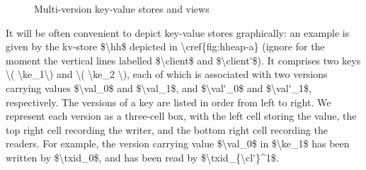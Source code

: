 \begin{figure}[t]
\begin{center}
\begin{onethirdsubfig}
\caption{A view for client \( \cl' \)}
\label{fig:view-of-cl-prime}
\end{onethirdsubfig}

\end{center}

\hrulefill

\caption{Multi-version key-value stores and views}
\label{fig:hheap}
\label{fig:key-value-store-and-view}
\label{fig:key-value-and-view}
\end{figure}
\ac{
It will be often convenient to depict key-value stores graphically: an 
example is given by the kv-store $\hh$ depicted in \cref{fig:hheap-a}
(ignore for the moment the vertical lines labelled $\client$ and $\client'$).
It comprises two keys \( \ke_1\) and \( \ke_2 \), 
each of which is associated with two versions carrying values $\val_0$ and $\val_1$, and $\val'_0$ and $\val'_1$, respectively.
The versions of a key are listed in order from left to right. 
We represent each version as a three-cell box, with the left cell storing the value, the top right cell recording the writer, and the bottom right cell recording the readers. 
For example, the version carrying value $\val_0$ in $\ke_1$ has been written by $\txid_0$, and has been read by $\txid_{\cl'}^1$.
}


